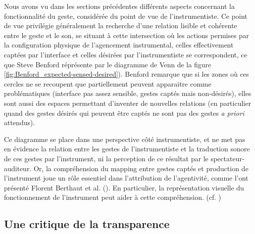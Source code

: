 \noindent Nous avons vu dans les sections précédentes différents aspects concernant la fonctionnalité du geste, considérée du point de vue de l'instrumentiste. Ce point de vue privilégie généralement la recherche d'une relation lisible et cohérente entre le geste et le son, se situant à cette intersection où les actions permises par la configuration physique de l'agencement instrumental, celles effectivement captées par l'interface et celles désirées par l'instrumentiste se correspondent, ce que Steve Benford réprésente par le diagramme de Venn de la figure \ref{fig:Benford_expected-sensed-desired}). Benford remarque que si les zones où ces cercles ne se recoupent que partiellement peuvent apparaitre comme problématiques (interface pas assez sensible, gestes captés mais non-désirés), elles sont aussi des espaces permettant d'inventer de nouvelles relations (en particulier quand des gestes désirés qui peuvent être captés ne sont pas des gestes \textit{a priori} attendus).

\indent Ce diagramme se place dans une perspective côté instrumentiste, et ne met pas en évidence la relation entre les gestes de l'instrumentiste et la traduction sonore de ces gestes par l'instrument, ni la perception de ce résultat par le spectateur-auditeur. Or, la compréhension du mapping entre gestes captés et production de l'instrument joue un rôle essentiel dans l'attribution de l'agentivité, comme l'ont présenté Florent Berthaut et al. (\cite{berthaut_liveness_2015}). En particulier, la représentation visuelle du fonctionnement de l'instrument peut aider à cette compréhension. (cf. \cite{berthaut_rouages:_2013})

\subsection{Une critique de la transparence}

